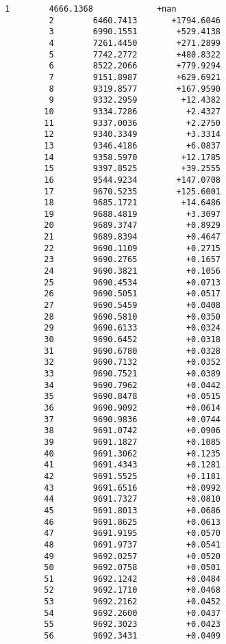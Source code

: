 \documentclass[11pt]{article}
\begin{document}
    \begin{Verbatim}[commandchars=\\\{\}]
         1        4666.1368             +nan
         2        6460.7413       +1794.6046
         3        6990.1551        +529.4138
         4        7261.4450        +271.2899
         5        7742.2772        +480.8322
         6        8522.2066        +779.9294
         7        9151.8987        +629.6921
         8        9319.8577        +167.9590
         9        9332.2959         +12.4382
        10        9334.7286          +2.4327
        11        9337.0036          +2.2750
        12        9340.3349          +3.3314
        13        9346.4186          +6.0837
        14        9358.5970         +12.1785
        15        9397.8525         +39.2555
        16        9544.9234        +147.0708
        17        9670.5235        +125.6001
        18        9685.1721         +14.6486
        19        9688.4819          +3.3097
        20        9689.3747          +0.8929
        21        9689.8394          +0.4647
        22        9690.1109          +0.2715
        23        9690.2765          +0.1657
        24        9690.3821          +0.1056
        25        9690.4534          +0.0713
        26        9690.5051          +0.0517
        27        9690.5459          +0.0408
        28        9690.5810          +0.0350
        29        9690.6133          +0.0324
        30        9690.6452          +0.0318
        31        9690.6780          +0.0328
        32        9690.7132          +0.0352
        33        9690.7521          +0.0389
        34        9690.7962          +0.0442
        35        9690.8478          +0.0515
        36        9690.9092          +0.0614
        37        9690.9836          +0.0744
        38        9691.0742          +0.0906
        39        9691.1827          +0.1085
        40        9691.3062          +0.1235
        41        9691.4343          +0.1281
        42        9691.5525          +0.1181
        43        9691.6516          +0.0992
        44        9691.7327          +0.0810
        45        9691.8013          +0.0686
        46        9691.8625          +0.0613
        47        9691.9195          +0.0570
        48        9691.9737          +0.0541
        49        9692.0257          +0.0520
        50        9692.0758          +0.0501
        51        9692.1242          +0.0484
        52        9692.1710          +0.0468
        53        9692.2162          +0.0452
        54        9692.2600          +0.0437
        55        9692.3023          +0.0423
        56        9692.3431          +0.0409

\end{Verbatim}
\end{document}
